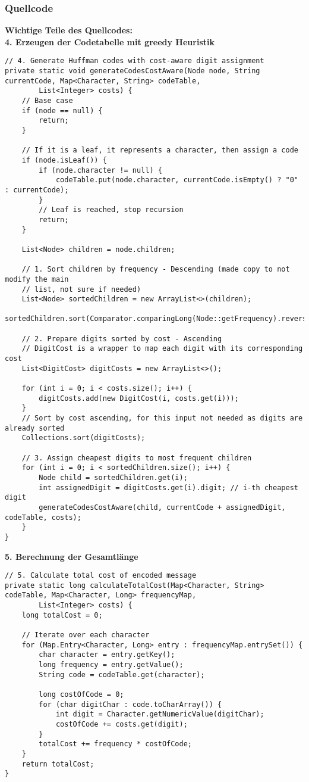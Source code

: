 \documentclass[a4paper,10pt,ngerman]{scrartcl}
\begin{document}
\subsubsection{Quellcode}
\textbf{Wichtige Teile des Quellcodes:}\\

\textbf{4. Erzeugen der Codetabelle mit greedy Heuristik}
\begin{lstlisting}
// 4. Generate Huffman codes with cost-aware digit assignment
private static void generateCodesCostAware(Node node, String currentCode, Map<Character, String> codeTable,
        List<Integer> costs) {
    // Base case
    if (node == null) {
        return;
    }

    // If it is a leaf, it represents a character, then assign a code
    if (node.isLeaf()) {
        if (node.character != null) {
            codeTable.put(node.character, currentCode.isEmpty() ? "0" : currentCode);
        }
        // Leaf is reached, stop recursion
        return;
    }

    List<Node> children = node.children;

    // 1. Sort children by frequency - Descending (made copy to not modify the main
    // list, not sure if needed)
    List<Node> sortedChildren = new ArrayList<>(children);
    sortedChildren.sort(Comparator.comparingLong(Node::getFrequency).reversed());

    // 2. Prepare digits sorted by cost - Ascending
    // DigitCost is a wrapper to map each digit with its corresponding cost
    List<DigitCost> digitCosts = new ArrayList<>();

    for (int i = 0; i < costs.size(); i++) {
        digitCosts.add(new DigitCost(i, costs.get(i)));
    } 
    // Sort by cost ascending, for this input not needed as digits are already sorted
    Collections.sort(digitCosts);

    // 3. Assign cheapest digits to most frequent children
    for (int i = 0; i < sortedChildren.size(); i++) {
        Node child = sortedChildren.get(i);
        int assignedDigit = digitCosts.get(i).digit; // i-th cheapest digit
        generateCodesCostAware(child, currentCode + assignedDigit, codeTable, costs);
    }
}
\end{lstlisting}
\textbf{5. Berechnung der Gesamtlänge}

\begin{lstlisting}
// 5. Calculate total cost of encoded message
private static long calculateTotalCost(Map<Character, String> codeTable, Map<Character, Long> frequencyMap,
        List<Integer> costs) {
    long totalCost = 0;

    // Iterate over each character
    for (Map.Entry<Character, Long> entry : frequencyMap.entrySet()) {
        char character = entry.getKey();
        long frequency = entry.getValue();
        String code = codeTable.get(character);

        long costOfCode = 0;
        for (char digitChar : code.toCharArray()) {
            int digit = Character.getNumericValue(digitChar);
            costOfCode += costs.get(digit);
        }
        totalCost += frequency * costOfCode;
    }
    return totalCost;
}
\end{lstlisting}
\end{document}
